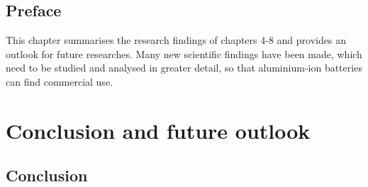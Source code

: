 \section*{Preface}
This chapter summarises the research findings of chapters 4-8 and provides an outlook for future researches. Many new scientific findings have been made, which need to be studied and analysed in greater detail, so that aluminium-ion batteries can find commercial use.
\newpage
\chapter{Conclusion and future outlook} 
\label{chap9} 
\section*{Conclusion}

